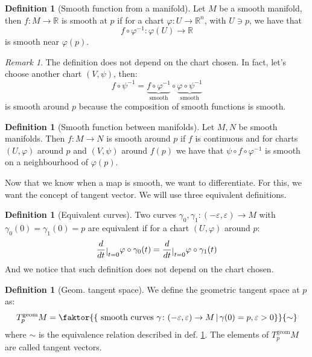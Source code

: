 \documentclass[a4paper,11pt,titlepage, article, oneside]{memoir}
\numberwithin{equation}{section}
\theoremstyle{definition}
\newtheorem{definition}[theorem]{Definition}
\theoremstyle{remark}
\newtheorem{remark}[theorem]{Remark}
\newcommand{\rfield}{\mathbb{R}}
\newcommand{\restrict}[2]{{#1}\raisebox{-.5ex}{$|$}_{#2}}
\newcommand{\diondi}[1]{\frac{d}{d{#1}}}
\newcommand{\tangentgeom}[1]{T_{#1}^{\text{geom}}}
\begin{document}
\begin{definition}[Smooth function from a manifold]
Let $M$ be a smooth manifold, then $f \colon M \rightarrow \rfield $ is smooth at $p$ if for a chart $\varphi \colon U \rightarrow \rfield^n$, with $U \ni p$, we have that
$$f \circ \varphi^{-1} \colon \varphi(U) \rightarrow \rfield$$
is smooth near $\varphi(p)$.
\end{definition}

\begin{remarkbox}
\begin{remark}
The definition does not depend on the chart chosen. In fact, let's choose another chart $(V, \psi)$, then:
$$f \circ \psi^{-1} = \underbrace{f \circ \varphi^{-1}}_{\text{smooth}} \circ \underbrace{\varphi \circ \psi^{-1}}_{\text{smooth}}$$
is smooth around $p$ because the composition of smooth functions is smooth.
\end{remark}
\end{remarkbox}

\begin{definition}[Smooth function between manifolds]
Let $M, N$ be smooth manifolds. Then $f \colon M \rightarrow N$ is smooth around $p$ if $f$ is continuous and for charts $(U, \varphi)$ around $p$ and $(V, \psi)$ around $f(p)$ we have that $\psi \circ f \circ \varphi^{-1}$ is smooth on a neighbourhood of $\varphi(p)$.
\end{definition}

Now that we know when a map is smooth, we want to differentiate. For this, we want the concept of tangent vector. We will use three equivalent definitions.

\begin{definition}[Equivalent curves] \label{equivcurves}
Two curves $\gamma_0, \gamma_1 \colon (-\varepsilon, \varepsilon) \rightarrow M$ with $\gamma_0(0)=\gamma_1(0)=p$ are equivalent if for a chart $(U, \varphi)$ around $p$:
\begin{equation*}
\restrict{\diondi{t}}{t=0} \varphi \circ \gamma_0(t) = \restrict{\diondi{t}}{t=0} \varphi \circ \gamma_1(t)
\end{equation*}
And we notice that such definition does not depend on the chart chosen.
\end{definition}

\begin{definition}[Geom. tangent space] \label{geomtangent}
We define the geometric tangent space at $p$ as:
\begin{equation}
\tangentgeom{p} M = \faktor{ 
\left \{ \text{ smooth curves } \gamma \colon (-\varepsilon, \varepsilon) \rightarrow M \, | \, \gamma(0) = p, \varepsilon > 0 \right \}}
{\sim}
\end{equation}
where $\sim$ is the equivalence relation described in def. \ref{equivcurves}. The elements of $\tangentgeom{p} M$ are called tangent vectors.  
\end{definition}
\end{document}
